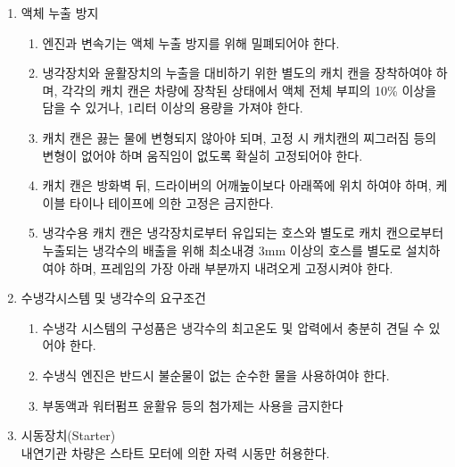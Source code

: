 \documentclass[final,a4paper,10pt]{report}
\begin{document}
\begin{enumerate}
  \item\label{rule:formula-technical.powertrain.liquid-leak-prevention} 액체 누출 방지
    \begin{enumerate}
      \item\label{rule:formula-technical.powertrain.liquid-leak-prevention.engine-and-transmission-sealing} 엔진과 변속기는 액체 누출 방지를 위해 밀폐되어야 한다.
      \item\label{rule:formula-technical.powertrain.liquid-leak-prevention.catch-can-min-capacity} 냉각장치와 윤활장치의 누출을 대비하기 위한 별도의 캐치 캔을 장착하여야 하며, 각각의 캐치 캔은 {\color{blue} 차량에 장착된 상태에서} 액체 전체 부피의 10\% 이상을 담을 수 있거나, 1리터 이상의 용량을 가져야 한다.
      \item\label{rule:formula-technical.powertrain.liquid-leak-prevention.catch-can-heat-mounting} 캐치 캔은 끓는 물에 변형되지 않아야 되며, 고정 시 캐치캔의 찌그러짐 등의 변형이 없어야 하며 움직임이 없도록 확실히 고정되어야 한다.
      \item\label{rule:formula-technical.powertrain.liquid-leak-prevention.catch-can-location-fastening} 캐치 캔은 방화벽 뒤, 드라이버의 어깨높이보다 아래쪽에 위치 하여야 하며, 케이블 타이나 테이프에 의한 고정은 금지한다.
      \item\label{rule:formula-technical.powertrain.liquid-leak-prevention.coolant-catch-can-hose} 냉각수용 캐치 캔은 냉각장치로부터 유입되는 호스와 별도로 캐치 캔으로부터 누출되는 냉각수의 배출을 위해 최소내경 3mm 이상의 호스를 별도로 설치하여야 하며, 프레임의 가장 아래 부분까지 내려오게 고정시켜야 한다.
    \end{enumerate}
  \item\label{rule:formula-technical.powertrain.cooling-system-and-coolant} 수냉각시스템 및 냉각수의 요구조건
    \begin{enumerate}
      \item\label{rule:formula-technical.powertrain.cooling-system-and-coolant.temperature-and-pressure-tolerance} 수냉각 시스템의 구성품은 냉각수의 최고온도 및 압력에서 충분히 견딜 수 있어야 한다.
      \item\label{rule:formula-technical.powertrain.cooling-system-and-coolant.pure-water-only} 수냉식 엔진은 반드시 불순물이 없는 순수한 물을 사용하여야 한다.
      \item\label{rule:formula-technical.powertrain.cooling-system-and-coolant.no-antifreeze-or-additives} 부동액과 워터펌프 윤활유 등의 첨가제는 사용을 금지한다
    \end{enumerate}
  \item\label{rule:formula-technical.powertrain.self-start-only} 시동장치(Starter)\\
    내연기관 차량은 스타트 모터에 의한 자력 시동만 허용한다.
\end{enumerate}
\end{document}
